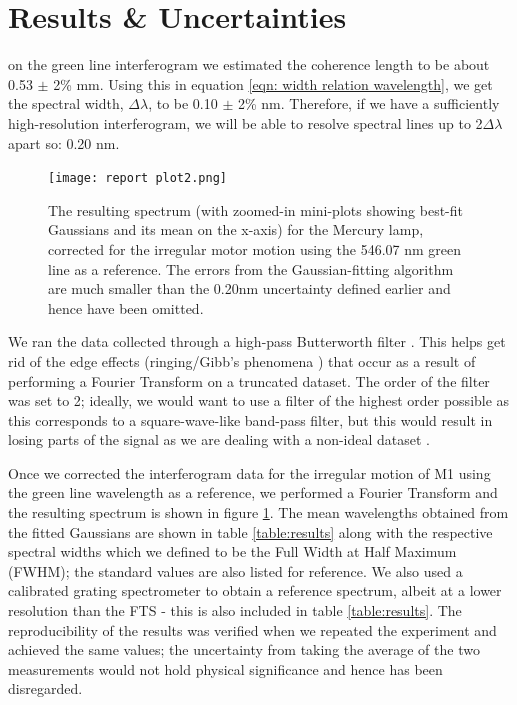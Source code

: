 \documentclass[journal]{Imperial_lab_report}
\begin{document}
\section{Results \& Uncertainties}
 on the green line interferogram we estimated the coherence length to be about 0.53 $\pm$ 2\% mm. Using this in equation \eqref{eqn: width relation wavelength}, we get the spectral width, $\Delta\lambda$, to be 0.10 $\pm$ 2\% nm. Therefore, if we have a sufficiently high-resolution interferogram, we will be able to resolve spectral lines up to 2$\Delta\lambda$ apart so: 0.20 nm. 

\begin{figure}
\centering
\captionsetup{font=footnotesize}
    \texttt{[image: report plot2.png]}
    \caption{The resulting spectrum (with zoomed-in mini-plots showing best-fit Gaussians and its mean on the x-axis) for the Mercury lamp, corrected for the irregular motor motion using the 546.07 nm green line as a reference. The errors from the Gaussian-fitting algorithm are much smaller than the 0.20nm uncertainty defined earlier and hence have been omitted.}
    \label{fig:spectrum}
\vspace{-14pt}
\end{figure}

We ran the data collected through a high-pass Butterworth filter \cite{Butterworth}. This helps get rid of the edge effects (ringing/Gibb's phenomena \cite{gibbs}) that occur as a result of performing a Fourier Transform on a truncated dataset. The order of the filter was set to 2; ideally, we would want to use a filter of the highest order possible as this corresponds to a square-wave-like band-pass filter, but this would result in losing parts of the signal as we are dealing with a non-ideal dataset \cite{Butterworth2}. 


Once we corrected the interferogram data for the irregular motion of M1 using the green line wavelength as a reference, we performed a Fourier Transform and the resulting spectrum is shown in figure \ref{fig:spectrum}. The mean wavelengths obtained from the fitted Gaussians are shown in table \ref{table:results} along with the respective spectral widths which we defined to be the Full Width at Half Maximum (FWHM); the standard values are also listed for reference. We also used a calibrated grating spectrometer to obtain a reference spectrum, albeit at a lower resolution than the FTS - this is also included in table \ref{table:results}. The reproducibility of the results was verified when we repeated the experiment and achieved the same values; the uncertainty from taking the average of the two measurements would not hold physical significance and hence has been disregarded. 
\end{document}
